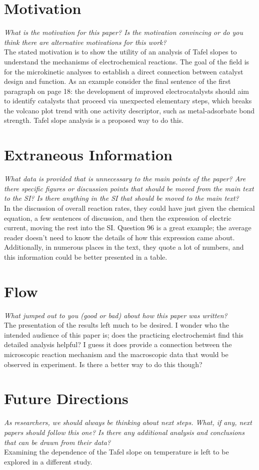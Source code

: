 \documentclass[12pt]{article}
\begin{document}
\section*{Motivation}
\textit{What is the motivation for this paper? Is the motivation convincing or do you think there are alternative motivations for this work?}\\[4pt]
The stated motivation is to show the utility of an analysis of Tafel slopes to understand the mechanisms of electrochemical reactions. The goal of the field is for the microkinetic analyses to establish a direct connection between catalyst design and function. As an example consider the final sentence of the first paragraph on page 18: the development of improved electrocatalysts should aim to identify catalysts that proceed via unexpected elementary steps, which breaks the volcano plot trend with one activity descriptor, such as metal-adsorbate bond strength.  Tafel slope analysis is a proposed way to do this. 

\section*{Extraneous Information}
\textit{What data is provided that is unnecessary to the main points of the paper? Are there specific figures or discussion points that should be moved from the main text to the SI? Is there anything in the SI that should be moved to the main text?}\\[4pt]
In the discussion of overall reaction rates, they could have just given the chemical equation, a few sentences of discussion, and then the expression of electric current, moving the rest into the SI. Question 96 is a great example; the average reader doesn't need to know the details of how this expression came about. Additionally, in numerous places in the text, they quote a lot of numbers, and this information could be better presented in a table.

\section*{Flow}
\textit{What jumped out to you (good or bad) about how this paper was written?}\\[4pt]
The presentation of the results left much to be desired. I wonder who the intended audience of this paper is; does the practicing electrochemist find this detailed analysis helpful? I guess it does provide a connection between the microscopic reaction mechanism and the macroscopic data that would be observed in experiment. Is there a better way to do this though?

\section*{Future Directions}
\textit{As researchers, we should always be thinking about next steps. What, if any, next papers should follow this one? Is there any additional analysis and conclusions that can be drawn from their data?}\\[4pt]
Examining the dependence of the Tafel slope on temperature is left to be explored in a different study.
\end{document}
